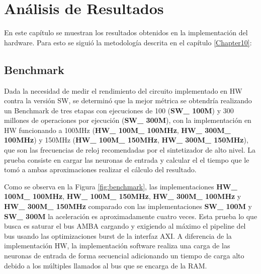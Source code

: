 
\chapter{Análisis de Resultados} %
\label{Chapter12}

En este capítulo se muestran los resultados obtenidos en la implementación del hardware. Para esto se siguió la metodología descrita en el capítulo \ref{Chapter10}: 
 
 \section{Benchmark}
Dada la necesidad de medir el rendimiento del circuito implementado en HW contra la versión SW, se determinó que la mejor métrica se obtendría realizando un Benchmark de tres etapas con ejecuciones de 100 (\textbf{SW\_ 100M}) y 300 millones de operaciones por ejecución (\textbf{SW\_ 300M}), con la implementación en HW funcionando a 100MHz (\textbf{HW\_ 100M\_ 100MHz}, \textbf{HW\_ 300M\_ 100MHz}) y 150MHz (\textbf{HW\_ 100M\_ 150MHz}, \textbf{HW\_ 300M\_ 150MHz}), que son las frecuencias de reloj recomendadas por el sintetizador de alto nivel. La prueba consiste en cargar las neuronas de entrada y calcular el el tiempo que le tomó a ambas aproximaciones realizar el cálculo del resultado.

Como se observa en la Figura \ref{fig:benchmark}, las implementaciones \textbf{HW\_ 100M\_ 100MHz}, \textbf{HW\_ 100M\_ 150MHz}, \textbf{HW\_ 300M\_ 100MHz} y \textbf{HW\_ 300M\_ 150MHz} comparado con las implementaciones \textbf{SW\_ 100M} y \textbf{SW\_ 300M} la aceleración es aproximadamente cuatro veces. Esta prueba lo que busca es saturar el bus AMBA cargando y exigiendo al máximo el pipeline del bus usando las optimizaciones burst de la interfaz AXI. A diferencia de la implementación HW, la implementación software realiza una carga de las neuronas de entrada de forma secuencial adicionando un tiempo de carga alto debido a los múltiples llamados al bus que se encarga de la RAM.


